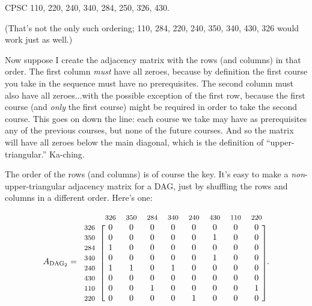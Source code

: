 \begin{alttitles}
\begin{center}
CPSC 110, 220, 240, 340, 284, 250, 326, 430.
\end{center}

(That's not the only such ordering; 110, 284, 220, 240, 350, 340, 430, 326
would work just as well.)

Now suppose I create the adjacency matrix with the rows (and columns) in that
order. The first column \textit{must} have all zeroes, because by definition
the first course you take in the sequence must have no prerequisites. The
second column must also have all zeroes...with the possible exception of the
first row, because the first course (and \textit{only} the first course) might
be required in order to take the second course. This goes on down the line:
each course we take may have as prerequisites any of the previous courses, but
none of the future courses. And so the matrix will have all zeroes below the
main diagonal, which is the definition of ``upper-triangular.'' Ka-ching.

The order of the rows (and columns) is of course the key. It's easy to make a
\textit{non}-upper-triangular adjacency matrix for a DAG, just by shuffling the
rows and columns in a different order. Here's one:

\[
A_{\textrm{DAG}_2} = 
\begin{blockarray}{ccccccccc}
& {\footnotesize\textrm{326}}
& {\footnotesize\textrm{350}}
& {\footnotesize\textrm{284}}
& {\footnotesize\textrm{340}}
& {\footnotesize\textrm{240}}
& {\footnotesize\textrm{430}}
& {\footnotesize\textrm{110}}
& {\footnotesize\textrm{220}}\\
\begin{block}{c[cccccccc]}
{\footnotesize\textrm{326}} & 0 & 0 & 0 & 0 & 0 & 0 & 0 & 0 \\
{\footnotesize\textrm{350}} & 0 & 0 & 0 & 0 & 0 & 1 & 0 & 0 \\
{\footnotesize\textrm{284}} & 1 & 0 & 0 & 0 & 0 & 0 & 0 & 0 \\
{\footnotesize\textrm{340}} & 0 & 0 & 0 & 0 & 0 & 1 & 0 & 0 \\
{\footnotesize\textrm{240}} & 1 & 1 & 0 & 1 & 0 & 0 & 0 & 0 \\
{\footnotesize\textrm{430}} & 0 & 0 & 0 & 0 & 0 & 0 & 0 & 0 \\
{\footnotesize\textrm{110}} & 0 & 0 & 1 & 0 & 0 & 0 & 0 & 1 \\
{\footnotesize\textrm{220}} & 0 & 0 & 0 & 0 & 1 & 0 & 0 & 0 \\
\end{block}
\end{blockarray}.
\]


\end{alttitles}
